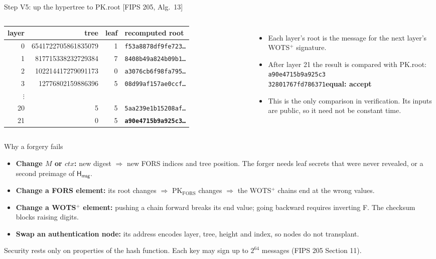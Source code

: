 \documentclass[aspectratio=169,11pt]{beamer}
\newcommand{\hx}[1]{\texttt{#1}}
\newcommand{\pk}[1]{\textcolor{pub}{#1}}
\newcommand{\alg}[1]{\textcolor{quiet}{\footnotesize[FIPS 205, Alg.~#1]}}
\begin{document}
\begin{frame}{Step V5: up the hypertree to \pk{PK.root} \alg{13}}
  \begin{columns}[T]
    \centering\footnotesize
    \begin{tabular}{@{}r r r l@{}}
      \toprule
      layer & tree & leaf & recomputed root \\
      \midrule
      0 & 6541722705861835079 & 1 & \hx{f53a8878df9fe723\ldots} \\
      1 & 817715338232729384 & 7 & \hx{8408b49a824b09b1\ldots} \\
      2 & 102214417279091173 & 0 & \hx{a3076cb6f98fa795\ldots} \\
      3 & 12776802159886396 & 5 & \hx{08d99af157ae0ccf\ldots} \\
      $\vdots$ & & & \\
      20 & 5 & 5 & \hx{5aa239e1b15208af\ldots} \\
      21 & 0 & 5 & \textbf{\hx{a90e4715b9a925c3\ldots}} \\
      \bottomrule
    \end{tabular}
    \small
    \begin{itemize}
      \item Each layer's root is the message for the next layer's WOTS$^+$ signature.
      \item After layer 21 the result is compared with \pk{PK.root}:\\[1mm]
        \hx{a90e4715b9a925c3}\\\hx{32801767fd786371}\quad \textcolor{sig}{\textbf{equal: accept}}
      \item This is the only comparison in verification. Its inputs are public, so it need not be constant time.
    \end{itemize}
  \end{columns}
\end{frame}

\begin{frame}{Why a forgery fails}
  \begin{itemize}
    \item \textbf{Change $M$ or $\mathit{ctx}$:} new digest $\Rightarrow$ new FORS indices and tree position. The forger needs leaf secrets that were never revealed, or a second preimage of $\mathsf{H_{msg}}$.
    \item \textbf{Change a FORS element:} its root changes $\Rightarrow$ PK$_{\text{FORS}}$ changes $\Rightarrow$ the WOTS$^+$ chains end at the wrong values.
    \item \textbf{Change a WOTS$^+$ element:} pushing a chain forward breaks its end value; going backward requires inverting F. The checksum blocks raising digits.
    \item \textbf{Swap an authentication node:} its address encodes layer, tree, height and index, so nodes do not transplant.
  \end{itemize}
  \vspace{2mm}
  \small\textcolor{quiet}{Security rests only on properties of the hash function. Each key may sign up to $2^{64}$ messages (FIPS 205 Section 11).}
\end{frame}
\end{document}
